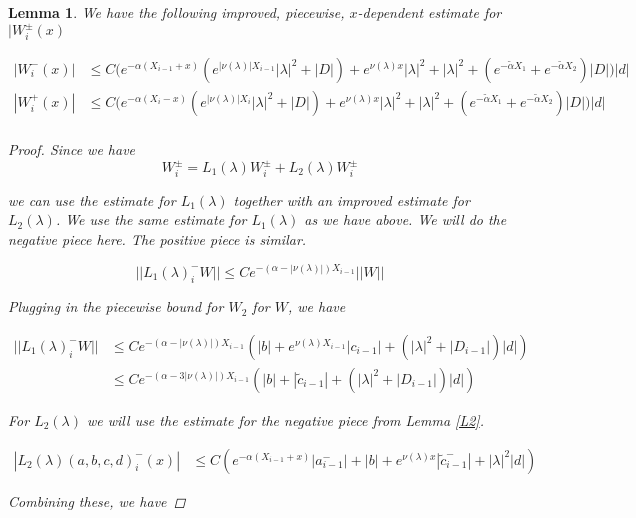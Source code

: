 \documentclass[12pt]{article}
\newtheorem{lemma}{Lemma}
\begin{document}
\begin{lemma}
We have the following improved, piecewise, $x$-dependent estimate for $|W_i^\pm(x)$

\begin{align*}
| W_i^-(x)| &\leq C \Big(e^{-\alpha(X_{i-1} + x)}( e^{|\nu(\lambda)| X_{i-1}} |\lambda|^2 + |D|) + e^{\nu(\lambda)x} |\lambda|^2 
+ |\lambda|^2 + (e^{-\tilde{\alpha} X_1} + e^{-\tilde{\alpha} X_2}) |D| \Big) |d| \\
| W_i^+(x)| &\leq C \Big(e^{-\alpha(X_i - x)}( e^{|\nu(\lambda)| X_i} |\lambda|^2 + |D|) + e^{\nu(\lambda)x} |\lambda|^2 
+ |\lambda|^2 + (e^{-\tilde{\alpha} X_1} + e^{-\tilde{\alpha} X_2}) |D| \Big) |d| \\
\end{align*}

\begin{proof}

Since we have 
\[
W_i^\pm = L_1(\lambda)W_i^\pm + L_2(\lambda)W_i^\pm 
\]

we can use the estimate for $L_1(\lambda)$ together with an improved estimate for $L_2(\lambda)$. We use the same estimate for $L_1(\lambda)$ as we have above. We will do the negative piece here. The positive piece is similar.

\[
||L_1(\lambda)_i^- W|| \leq C e^{-(\alpha -|\nu(\lambda)|)X_{i-1}} ||W||
\]

Plugging in the piecewise bound for $W_2$ for $W$, we have

\begin{align*}
||L_1(\lambda)_i^- W|| &\leq C e^{-(\alpha -|\nu(\lambda)|)X_{i-1}} ( |b| + e^{\nu(\lambda)X_{i-1}}|c_{i-1}| + (|\lambda|^2 + |D_{i-1}|)|d| ) \\
&\leq C e^{-(\alpha - 3|\nu(\lambda)|)X_{i-1}} ( |b| + |\tilde{c}_{i-1}| + (|\lambda|^2 + |D_{i-1}|)|d| ) 
\end{align*}

For $L_2(\lambda)$ we will use the estimate for the negative piece from Lemma \ref{L2}.

\begin{align*}
|L_2(\lambda)(a,b,c,d)_i^-(x)| &\leq C (e^{-\alpha(X_{i-1} + x)}|a_{i-1}^-| + |b| + e^{\nu(\lambda)x} |\tilde{c}_{i-1}^-| + |\lambda|^2 |d| )
\end{align*}

Combining these, we have


\end{proof}
\end{lemma}
\end{document}
